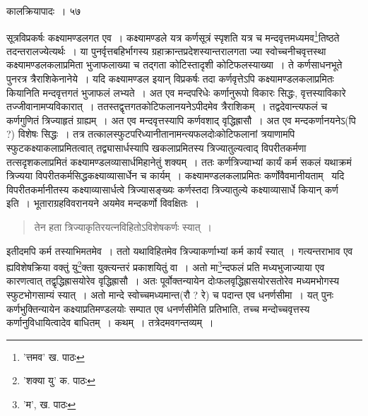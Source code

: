 \documentclass[11pt, openany]{book}
\begin{document}
{{{{{\vspace{3cm} \hspace{4cm} कालक्रियापादः~।\hspace{4cm} ५७

\vspace{0.3cm}
\noindent सूत्रविप्रकर्षः कक्ष्यामण्डलगत एव~। कक्ष्यामण्डले यत्र कर्णसूत्रं स्पृशति यत्र च मन्दवृत्तमध्यमव\renewcommand{\thefootnote}{१}\footnote{'त्तमव' ख. पाठः}तिष्ठते तदन्तरालज्येत्यर्थः~। या
पुनर्वृत्तबहिर्भागस्य ग्रहाक्रान्तप्रदेशस्यान्तरालगता ज्या स्वोच्चनीचवृत्तस्था कक्ष्यामण्डलकलाप्रमिता भुजाफलाख्या च तद्गता कोटिस्तादृशी कोटिफलस्याख्या~। ते कर्णसाधनभूते पुनरत्र त्रैराशिकेनानेये~। यदि कक्ष्यामण्डल इयान् विप्रकर्षः तदा कर्णवृत्तेऽपि कक्ष्यामण्डलकलाप्रमितः कियानिति मन्दवृत्तगतं भुजाफलं लभ्यते~। अत एव मन्दपरिधेः कर्णानुरूपो विकारः सिद्धः, वृत्तस्याविकारे तज्जीवानामप्यविकारात्~। ततस्तद्वृत्तगतकोटिफलानयनेऽपीदमेव त्रैराशिकम्~। तद्वदेवान्त्यफलं च कर्णगुणितं त्रिज्याहृतं ग्राह्यम्~। अत एव मन्दवृत्तस्यापि कर्णवशाद् वृद्धिह्रासौ~। अत एव मन्दकर्णानयनेऽ(पि ?) विशेषः सिद्धः~। तत्र तत्कालस्फुटपरिध्यानीतानामन्त्यफलदोःकोटिफलानां त्रयाणामपि स्फुटकक्ष्याकलाप्रमितत्वात् तद्व्यासार्धस्यापि खकलाप्रमितस्य त्रिज्यातुल्यत्वाद् विपरीतकर्मणा तत्सदृशकलाप्रमितं
कक्ष्यामण्डलव्यासार्धमिहानेतुं शक्यम्~। ततः कर्णत्रिज्याभ्यां कार्यं कर्म सकलं यथाक्रमं त्रिज्यया विपरीतकर्मसिद्धकक्ष्याव्यासार्धेन च कार्यम्~। कक्ष्यामण्डलकलाप्रमितः कर्णोवैवमानीयताम्  \textendash\ यदि विपरीतकर्मानीतस्य कक्ष्याव्यासार्धत्वे त्रिज्यासङ्ख्यः कर्णस्तदा त्रिज्यातुल्ये कक्ष्याव्यासार्धे कियान् कर्ण इति~। भूताराग्रहविवरानयने अयमेव मन्दकर्णो विवक्षितः~। 

\begin{quote}
{\qt तेन हता त्रिज्याकृतिरयत्नविहितोऽविशेषकर्णः स्यात्~।}
\end{quote}

\noindent इतीदमपि कर्म तस्याभिमतमेव~। ततो यथाविहितमेव त्रिज्याकर्णाभ्यां कर्म कार्यं स्यात्~। गत्यन्तराभाव एव ह्यविशेषक्रिया वक्तुं यु\renewcommand{\thefootnote}{२}\footnote{'शक्या यु' क. पाठः}क्ता युक्त्यन्तरं प्रकाशयितुं वा~। अतो मा\renewcommand{\thefootnote}{३}\footnote{'म', ख. पाठः}न्दफलं प्रति मध्यभुजाज्याया एव कारणत्वात् तद्वृद्धिह्रासयोरेव वृद्धिह्रासौ~। अतः पूर्वोक्तन्यायेन दोःफलवृद्धिह्रासयोरसतोरेव मध्यमभोगस्य स्फुटभोगसाम्यं स्यात्~। अतो मान्दे स्वोच्चमध्यमान्त(रौ ? रे) च पदान्त एव धनर्णसीमा~। यत् पुनः कर्णभुक्तिन्यायेन कक्ष्याप्रतिमण्डलयोः सम्पात एव धनर्णसीमेति प्रतिभाति, तच्च मन्दोच्चवृत्तस्य कर्णानुविधायित्वादेव बाधितम्~। कथम्~। तत्रेदमवगन्तव्यम्~।

\newpage

}}}}}
\end{document}

